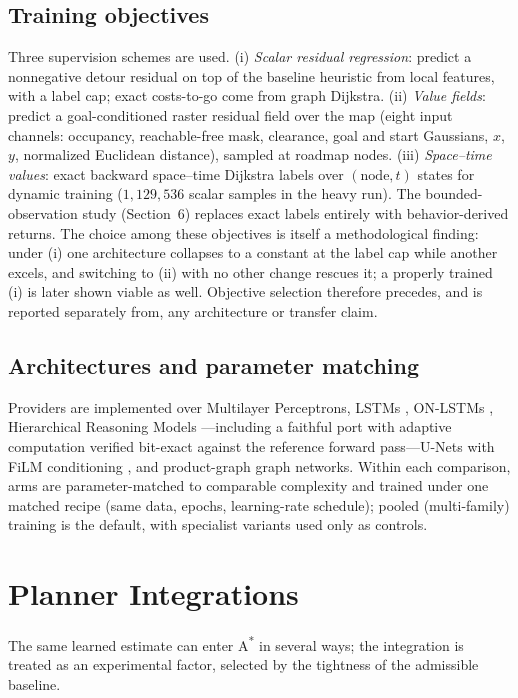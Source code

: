 \documentclass[11pt,letterpaper]{article}
\begin{document}
\subsection{Training objectives}
Three supervision schemes are used. (i) \emph{Scalar residual regression}: predict a nonnegative detour residual on top of the baseline heuristic from local features, with a label cap; exact costs-to-go come from graph Dijkstra. (ii) \emph{Value fields}: predict a goal-conditioned raster residual field over the map (eight input channels: occupancy, reachable-free mask, clearance, goal and start Gaussians, $x$, $y$, normalized Euclidean distance), sampled at roadmap nodes. (iii) \emph{Space--time values}: exact backward space--time Dijkstra labels over $(\text{node},t)$ states for dynamic training ($1{,}129{,}536$ scalar samples in the heavy run). The bounded-observation study (Section~6) replaces exact labels entirely with behavior-derived returns. The choice among these objectives is itself a methodological finding: under (i) one architecture collapses to a constant at the label cap while another excels, and switching to (ii) with no other change rescues it; a properly trained (i) is later shown viable as well. Objective selection therefore precedes, and is reported separately from, any architecture or transfer claim.

\subsection{Architectures and parameter matching}
Providers are implemented over Multilayer Perceptrons, LSTMs \citep{hochreiter1997lstm}, ON-LSTMs \citep{shen2019onlstm}, Hierarchical Reasoning Models \citep{wang2025hrm}---including a faithful port with adaptive computation \citep{graves2016act,banino2021pondernet} verified bit-exact against the reference forward pass---U-Nets \citep{ronneberger2015unet} with FiLM conditioning \citep{perez2018film}, and product-graph graph networks. Within each comparison, arms are parameter-matched to comparable complexity and trained under one matched recipe (same data, epochs, learning-rate schedule); pooled (multi-family) training is the default, with specialist variants used only as controls.

\section{Planner Integrations}

The same learned estimate can enter A\textsuperscript{*} in several ways; the integration is treated as an experimental factor, selected by the tightness of the admissible baseline.
\end{document}
